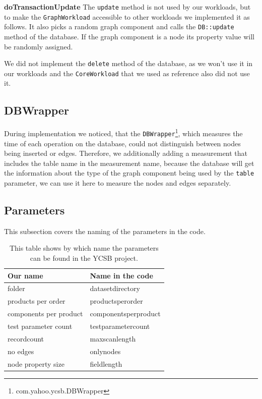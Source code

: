 \textbf{doTransactionUpdate} \newline
The \texttt{update} method is not used by our workloads,
but to make the \texttt{GraphWorkload} accessible to other workloads we implemented it as follows.
It also picks a random graph component and calls the \texttt{DB::update} method of the database.
If the graph component is a node its property value will be randomly assigned.

We did not implement the \texttt{delete} method of the database,
as we won't use it in our workloads and the \texttt{CoreWorkload} that we used as reference also did not use it.

\subsection{DBWrapper}
During implementation we noticed,
that the \texttt{DBWrapper}\footnote{com.yahoo.ycsb.DBWrapper},
which measures the time of each operation on the database,
could not distinguish between nodes being inserted or edges.
Therefore,
we additionally adding a measurement that includes the table name in the measurement name,
because the database will get the information about the type of the graph component being used by the \texttt{table} parameter,
we can use it here to measure the nodes and edges separately.

\subsection{Parameters}
This subsection covers the naming of the parameters in the code.

\begin{table}[h!]
  \begin{minipage}{\textwidth}
    \begin{tabularx}{\textwidth}{ | X | X | }
      \hline
      Our name & Name in the code \\ \hline \hline
      folder & datasetdirectory \\ \hline
      products per order & productsperorder \\ \hline
      components per product & componentsperproduct \\ \hline
      test parameter count & testparametercount \\ \hline
      recordcount & maxscanlength \\ \hline
      no edges & onlynodes \\ \hline
      node property size & fieldlength \\ \hline
    \end{tabularx}
  \end{minipage}
  \caption{This table shows by which name the parameters can be found in the YCSB project.}
  \label{tab:parameterMapping}
\end{table}

